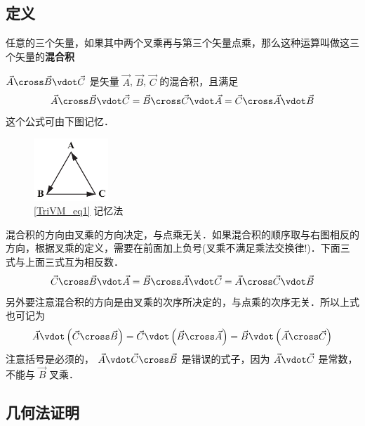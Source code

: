 
\subsection{定义}

任意的三个矢量，如果其中两个叉乘再与第三个矢量点乘，那么这种运算叫做这三个矢量的\textbf{混合积}

$\vec A \cross \vec B \vdot \vec C$ 是矢量 $\vec A$, $\vec B$, $\vec C$ 的混合积，且满足
\begin{equation}\label{TriVM_eq1}
\vec A \cross \vec B \vdot \vec C = \vec B \cross \vec C \vdot \vec A = \vec C \cross \vec A \vdot \vec B 
\end{equation} 
这个公式可由下图记忆．
\begin{figure}[ht]
\centering
\includegraphics[width=0.25\textwidth]{./figures/TriVM.pdf}
\caption{\autoref{TriVM_eq1} 记忆法}
\end{figure}
混合积的方向由叉乘的方向决定，与点乘无关．如果混合积的顺序取与右图相反的方向，根据叉乘的定义，需要在前面加上负号(叉乘不满足乘法交换律!)．下面三式与上面三式互为相反数．
\begin{equation}
\vec C \cross \vec B \vdot \vec A = \vec B \cross \vec A \vdot \vec C = \vec A \cross \vec C \vdot \vec B
\end{equation} 
另外要注意混合积的方向是由叉乘的次序所决定的，与点乘的次序无关．所以上式也可记为
 \begin{equation}
\vec A \vdot \left( {\vec C \cross \vec B} \right) = \vec C \vdot \left( {\vec B \cross \vec A} \right) = \vec B \vdot \left( {\vec A \cross \vec C} \right)
\end{equation} 
注意括号是必须的， $\vec A \vdot \vec C \cross \vec B$ 是错误的式子，因为 $\vec A \vdot \vec C$ 是常数，不能与 $\vec B$ 叉乘．


\subsection{几何法证明}

